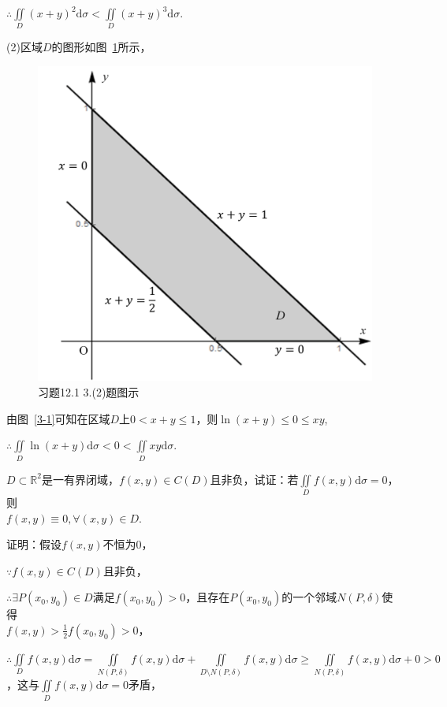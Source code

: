 \documentclass[12pt,UTF8]{ctexart}
\newcommand{\aIInt}[1]{\iint\limits_{#1}}
\begin{document}
\begin{enumerate}
$\therefore\aIInt{D}(x+y)^2\mathrm d\sigma<\aIInt{D}(x+y)^3\mathrm d\sigma$.

(2)区域$D$的图形如图~\ref{3-2}所示，
\begin{figure}[H]
\begin{center}
\includegraphics[height=0.3\textheight]{Figures/Fig3-2.png}
\end{center}
\caption{习题12.1 3.(2)题图示}
\label{3-2}
\end{figure}
由图~\ref{3-1}可知在区域$D$上$0<x+y\leqslant1$，则$\ln(x+y)\leqslant0\leqslant xy$,

$\therefore\aIInt{D}\ln(x+y)\mathrm d\sigma<0<\aIInt{D}xy\mathrm d\sigma$.

$D\subset\mathbb R^2$是一有界闭域，$f(x,y)\in C(D)$且非负，试证：若$\aIInt{D}f(x,y)\mathrm d\sigma=0$，则\\
$f(x,y)\equiv0,\forall(x,y)\in D$.

证明：假设$f(x,y)$不恒为$0$，

$\because f(x,y)\in C(D)$且非负，

$\therefore\exists P(x_0,y_0)\in D$满足$f(x_0,y_0)>0$，且存在$P(x_0,y_0)$的一个邻域$N(P,\delta)$使得\\
$f(x,y)>\frac12f(x_0,y_0)>0$，

$\therefore\aIInt{D}f(x,y)\mathrm d\sigma=\aIInt{N(P,\delta)}f(x,y)\mathrm d\sigma+\aIInt{D\setminus N(P,\delta)}f(x,y)\mathrm d\sigma\geqslant\aIInt{N(P,\delta)}f(x,y)\mathrm d\sigma+0>0$，这与$\aIInt{D}f(x,y)\mathrm d\sigma=0$矛盾，


\end{enumerate}
\end{document}
